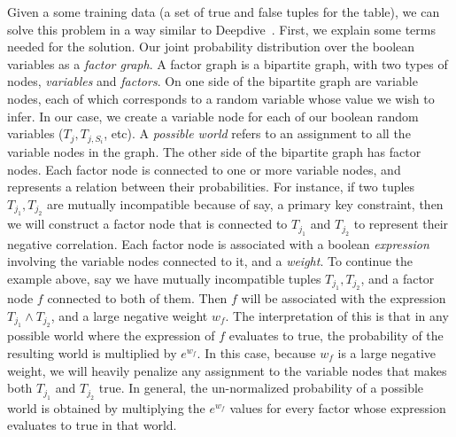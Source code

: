 \documentclass{sig-alternate}
\newcounter{prob}
\begin{document}
Given a some training data (a set of true and false tuples for the table), we can solve this problem in a way similar to Deepdive~\cite{deepdive,Niu_deepdive:web-scale}. First, we explain some terms needed for the solution. Our joint probability distribution over the boolean variables as a \textit{factor graph}. A factor graph is a bipartite graph, with two types of nodes, \textit{variables} and \textit{factors}. On one side of the bipartite graph are variable nodes, each of which corresponds to a random variable whose value we wish to infer. In our case, we create a variable node for each of our boolean random variables ($T_j, T_{j, S_i}$, etc). A \textit{possible world} refers to an assignment to all the variable nodes in the graph. The other side of the bipartite graph has factor nodes. Each factor node is connected to one or more variable nodes, and represents a relation between their probabilities. For instance, if two tuples $T_{j_1}, T_{j_2}$ are mutually incompatible because of say, a primary key constraint, then we will construct a factor node that is connected to $T_{j_1}$ and $T_{j_2}$ to represent their negative correlation. Each factor node is associated with a boolean \textit{expression} involving the variable nodes connected to it, and a \textit{weight}. To continue the example above, say we have mutually incompatible tuples $T_{j_1}, T_{j_2}$, and a factor node $f$ connected to both of them. Then $f$ will be associated with the expression $T_{j_1} \land T_{j_2}$, and a large negative weight $w_f$. The interpretation of this is that in any possible world where the expression of $f$ evaluates to true, the probability of the resulting world is multiplied by $e^{w_f}$. In this case, because $w_f$ is a large negative weight, we will heavily penalize any assignment to the variable nodes that makes both $T_{j_1}$ and $T_{j_2}$ true. In general, the un-normalized probability of a possible world is obtained by multiplying the $e^{w_f}$ values for every factor whose expression evaluates to true in that world. 
\end{document}
